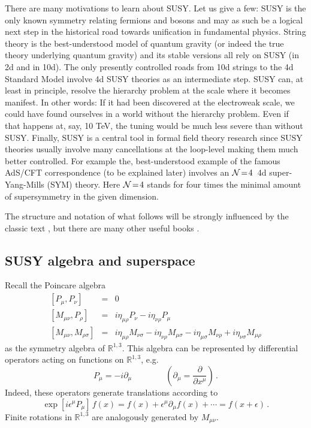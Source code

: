 \documentclass[12pt]{article}
\newcommand{\be}{\begin{equation}}
\newcommand{\ee}{\end{equation}}
\newcommand{\bea}{\begin{eqnarray}}
\newcommand{\eea}{\end{eqnarray}}
\numberwithin{equation}{section}
\begin{document}
There are many motivations to learn about SUSY. Let us give a few: SUSY is the only known symmetry relating fermions and bosons and may as such be a logical next step in the historical road towards unification in fundamental physics. String theory is the best-understood model of quantum gravity (or indeed the true theory underlying quantum gravity) and its stable versions all rely on SUSY (in 2d and in 10d). The only presently controlled roads from 10d strings to the 4d Standard Model involve 4d SUSY theories as an intermediate step. SUSY can, at least in principle, resolve the hierarchy problem at the scale where it becomes manifest. In other words: If it had been discovered at the electroweak scale, we could have found ourselves in a world without the hierarchy problem. Even if that happens at, say, 10 TeV, the tuning would be much less severe than without SUSY. Finally, SUSY is a central tool in formal field theory research since SUSY theories usually involve many cancellations at the loop-level making them much better controlled. For example the, best-understood example of the famous AdS/CFT correspondence (to be explained later) involves an ${\cal N}\!=\!4\,$ 4d super-Yang-Mills (SYM) theory. Here ${\cal N}\!=\!4$ stands for four times the minimal amount of supersymmetry in the given dimension.

The structure and notation of what follows will be strongly influenced by the classic text \cite{Wess:1992cp}, but there are many other useful books \cite{west, weinberg3, turning, shifman}.






\subsection{SUSY algebra and superspace}
Recall the Poincare algebra 
\bea
\left[ P_\mu,P_\nu \right]&=&0
\label{poi1}\\
\left[ M_{\mu\nu} , P_\rho \right] & = & i\eta_{\mu\rho}P_\nu-i\eta_{\nu\rho}P_\mu
\label{poi2}\\
\left[ M_{\mu\nu},M_{\rho\sigma}\right] &=&i\eta_{\mu\rho}M_{\nu\sigma}  
- i\eta_{\nu\rho}M_{\mu\sigma} 
- i\eta_{\mu\sigma}M_{\nu\rho}  
+ i\eta_{\nu\sigma}M_{\mu\rho} 
\label{poi3}
\eea
as the symmetry algebra of $\mathbb{R}^{1,3}$. This algebra can be represented by differential operators acting on functions on $\mathbb{R}^{1,3}$, e.g.
\be
P_\mu=-i\partial_\mu\qquad\qquad \left(\partial_\mu=\frac{\partial}{\partial x^\mu}\right)\,.
\ee
Indeed, these operators generate translations according to
\be
\exp[i\epsilon^\mu P_\mu]\,f(x)=f(x)+\epsilon^\mu \partial_\mu f(x)+\cdots = f(x+\epsilon)\,.
\ee
Finite rotations in $\mathbb{R}^{1,3}$ are analogously generated by $M_{\mu\nu}$. 
\end{document}
